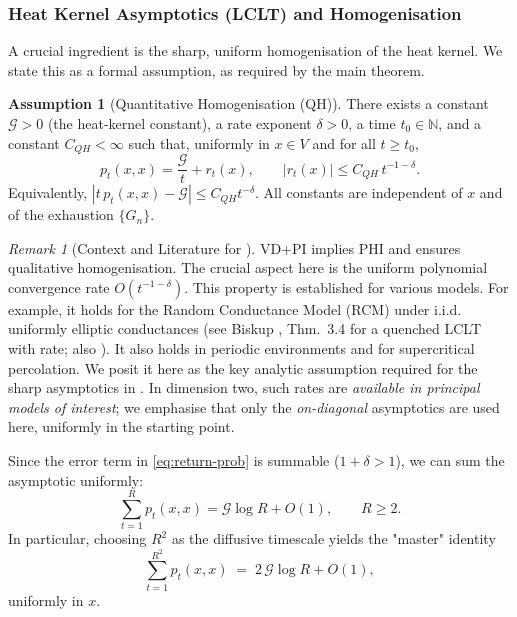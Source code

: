\documentclass{article}
\numberwithin{equation}{section}
\theoremstyle{definition}
\newtheorem{assumption}[theorem]{Assumption} %
\theoremstyle{remark}
\newtheorem{remark}[theorem]{Remark}
\newcommand{\cG}{\mathcal{G}}
\newcommand{\N}{\mathbb{N}}
\begin{document}
\subsubsection{Heat Kernel Asymptotics (LCLT) and Homogenisation}
A crucial ingredient is the sharp, uniform homogenisation of the heat kernel. We state this as a formal assumption, as required by the main theorem.

\begin{assumption}[Quantitative Homogenisation (QH)]\label{ass:QH}
There exists a constant $\cG > 0$ (the heat-kernel constant), a rate exponent $\delta>0$, a time $t_0\in\N$, and a constant $C_{QH}<\infty$ such that, uniformly in $x\in V$ and for all $t\ge t_0$,
\begin{equation}\label{eq:return-prob}
  p_t(x,x) = \frac{\cG}{t} + r_t(x),\qquad |r_t(x)| \le C_{QH}\, t^{-1-\delta}.
\end{equation}
Equivalently, $|t\,p_t(x,x)-\cG|\le C_{QH} t^{-\delta}$. All constants are independent of $x$ and of the exhaustion $\{G_n\}$.
\end{assumption}

\begin{remark}[Context and Literature for ]\label{rem:QH_validity}
VD+PI implies PHI \cite{Delmotte99} and ensures qualitative homogenisation. The crucial aspect here is the uniform polynomial convergence rate $O(t^{-1-\delta})$. This property is established for various models. For example, it holds for the Random Conductance Model (RCM) under i.i.d. uniformly elliptic conductances (see Biskup \cite{Biskup11}, Thm.\ 3.4 for a quenched LCLT with rate; also \cite{CroydonHambly21}). It also holds in periodic environments and for supercritical percolation. We posit it here as the key analytic assumption required for the sharp asymptotics in .
In dimension two, such rates are \emph{available in principal models of interest}; we emphasise that only the \emph{on-diagonal} asymptotics are used here, uniformly in the starting point.
\end{remark}

Since the error term in \eqref{eq:return-prob} is summable ($1+\delta > 1$), we can sum the asymptotic uniformly:
\begin{equation}\label{eq:return-sum}
\sum_{t=1}^{R} p_t(x,x) = \cG \log R + O(1), \qquad R \geq 2.
\end{equation}
In particular, choosing $R^2$ as the diffusive timescale yields the "master" identity
\begin{equation}\label{eq:master-sum}
  \sum_{t=1}^{R^{2}} p_t(x,x)
  \;=\; 2\,\cG \log R + O(1),
\end{equation}
uniformly in $x$.
\end{document}
